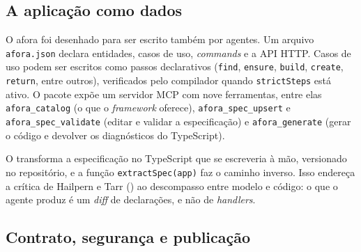 \documentclass[a4paper,12pt]{article}
\newcommand{\estr}[1]{\textit{#1}}
\begin{document}
\subsection{A aplicação como dados}

O afora foi desenhado para ser escrito também por agentes. Um arquivo \texttt{afora.json} declara entidades, casos de uso, \estr{commands} e a API HTTP. Casos de uso podem ser escritos como passos declarativos (\texttt{find}, \texttt{ensure}, \texttt{build}, \texttt{create}, \texttt{return}, entre outros), verificados pelo compilador quando \texttt{strictSteps} está ativo. O pacote  expõe um servidor MCP com nove ferramentas, entre elas \texttt{afora\_catalog} (o que o \estr{framework} oferece), \texttt{afora\_spec\_upsert} e \texttt{afora\_spec\_validate} (editar e validar a especificação) e \texttt{afora\_generate} (gerar o código e devolver os diagnósticos do TypeScript).

O  transforma a especificação no TypeScript que se escreveria à mão, versionado no repositório, e a função \texttt{extractSpec(app)} faz o caminho inverso. Isso endereça a crítica de Hailpern e Tarr (\citeyear{hailpern2006}) ao descompasso entre modelo e código: o que o agente produz é um \estr{diff} de declarações, e não de \estr{handlers}.

\subsection{Contrato, segurança e publicação}\label{sec:contrato}
\end{document}

